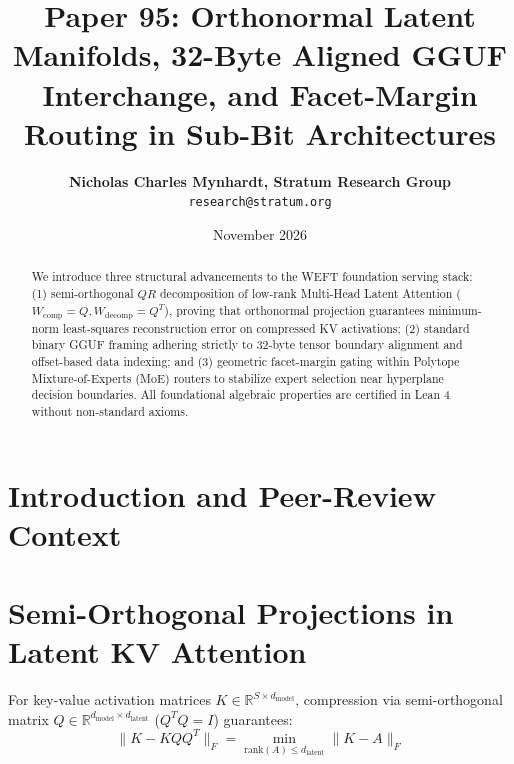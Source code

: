 \documentclass[11pt,a4paper]{article}
\title{\textbf{Paper 95: Orthonormal Latent Manifolds, 32-Byte Aligned GGUF Interchange, and Facet-Margin Routing in Sub-Bit Architectures}}
\author{\textbf{Nicholas Charles Mynhardt, Stratum Research Group} \\ \texttt{research@stratum.org}}
\date{November 2026}
\begin{document}
\maketitle

\begin{abstract}
We introduce three structural advancements to the WEFT foundation serving stack: (1) semi-orthogonal $QR$ decomposition of low-rank Multi-Head Latent Attention ($W_{\text{comp}} = Q, W_{\text{decomp}} = Q^T$), proving that orthonormal projection guarantees minimum-norm least-squares reconstruction error on compressed KV activations; (2) standard binary GGUF framing adhering strictly to 32-byte tensor boundary alignment and offset-based data indexing; and (3) geometric facet-margin gating within Polytope Mixture-of-Experts (MoE) routers to stabilize expert selection near hyperplane decision boundaries. All foundational algebraic properties are certified in Lean 4 without non-standard axioms.
\end{abstract}

\section{Introduction and Peer-Review Context}
\noindent{}

\section{Semi-Orthogonal Projections in Latent KV Attention}
For key-value activation matrices $K \in \mathbb{R}^{S \times d_{\text{model}}}$, compression via semi-orthogonal matrix $Q \in \mathbb{R}^{d_{\text{model}} \times d_{\text{latent}}}$ ($Q^T Q = I$) guarantees:
\begin{equation}
\| K - K Q Q^T \|_F = \min_{\text{rank}(A) \le d_{\text{latent}}} \| K - A \|_F
\end{equation}
\end{document}
